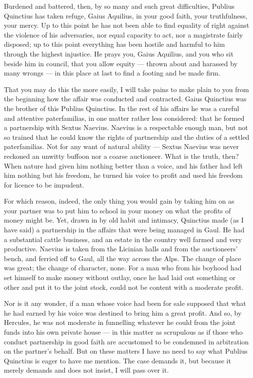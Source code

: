  Burdened and battered, then, by so many and such great difficulties, Publius Quinctius has taken refuge, Gaius Aquilius, in your good faith, your truthfulness, your mercy. Up to this point he has not been able to find equality of right against the violence of his adversaries, nor equal capacity to act, nor a magistrate fairly disposed; up to this point everything has been hostile and harmful to him through the highest injustice. He prays you, Gaius Aquilius, and you who sit beside him in council, that you allow equity --- thrown about and harassed by many wrongs --- in this place at last to find a footing and be made firm.

 That you may do this the more easily, I will take pains to make plain to you from the beginning how the affair was conducted and contracted. Gaius Quinctius was the brother of this Publius Quinctius. In the rest of his affairs he was a careful and attentive paterfamilias, in one matter rather less considered: that he formed a partnership with Sextus Naevius. Naevius is a respectable enough man, but not so trained that he could know the rights of partnership and the duties of a settled paterfamilias. Not for any want of natural ability — Sextus Naevius was never reckoned an unwitty buffoon nor a coarse auctioneer. What is the truth, then? When nature had given him nothing better than a voice, and his father had left him nothing but his freedom, he turned his voice to profit and used his freedom for licence to be impudent.

 For which reason, indeed, the only thing you would gain by taking him on as your partner was to put him to school in your money on what the profits of money might be. Yet, drawn in by old habit and intimacy, Quinctius made (as I have said) a partnership in the affairs that were being managed in Gaul. He had a substantial cattle business, and an estate in the country well farmed and very productive. Naevius is taken from the Licinian halls and from the auctioneers' bench, and ferried off to Gaul, all the way across the Alps. The change of place was great; the change of character, none. For a man who from his boyhood had set himself to make money without outlay, once he had laid out something or other and put it to the joint stock, could not be content with a moderate profit.

 Nor is it any wonder, if a man whose voice had been for sale supposed that what he had earned by his voice was destined to bring him a great profit. And so, by Hercules, he was not moderate in funnelling whatever he could from the joint funds into his own private house --- in this matter as scrupulous as if those who conduct partnership in good faith are accustomed to be condemned in arbitration on the partner's behalf. But on these matters I have no need to say what Publius Quinctius is eager to have me mention. The case demands it, but because it merely demands and does not insist, I will pass over it.

